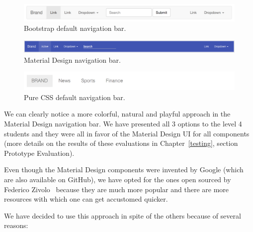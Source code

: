\documentclass{l4proj}
\begin{document}
\begin{figure}[!ht]
    \centering
    \includegraphics[scale=0.35]{bootstrap-navbar}
    \caption{Bootstrap default navigation bar.}
    \label{fig:bootstrap-navbar}
\end{figure}

\begin{figure}[!ht]
    \centering
    \includegraphics[scale=0.35]{material-design-navbar}
    \caption{Material Design navigation bar.}
    \label{fig:material-design-navbar}
\end{figure}

\begin{figure}[!ht]
    \centering
    \includegraphics[scale=0.35]{purecss-navbar}
    \caption{Pure CSS default navigation bar.}
    \label{fig:purecss-navbar}
\end{figure}

We can clearly notice a more colorful, natural and playful approach in the Material Design navigation bar. We have
presented all 3 options to the level 4 students and they were all in favor of the Material Design UI for all components
(more details on the results of these evaluations in Chapter~\ref{testing}, section Prototype Evaluation).

Even though the Material Design components were invented by Google (which are also available on GitHub), we have opted for the ones open sourced by Federico
Zivolo~\cite{material-design} because they are much more popular and there are more resources with which one can get
accustomed quicker. 

We have decided to use this approach in spite of the others because of several reasons:
\end{document}
